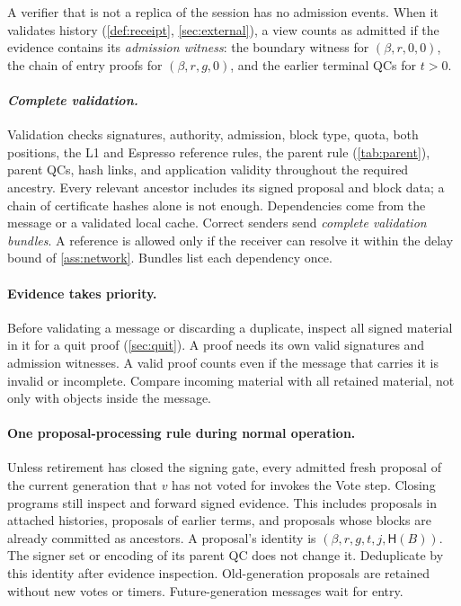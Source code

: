 \documentclass[11pt,a4paper]{article}
\newcommand{\Hash}{\mathsf H}
\newcommand{\defterm}[1]{\textcolor{rrBlue}{\textit{#1}}}
\begin{document}
A verifier that is not a replica of the session has no
admission events. When it validates history (\cref{def:receipt},
\cref{sec:external}), a view counts as admitted if the evidence contains
its \defterm{admission witness}: the boundary witness for $(\beta,r,0,0)$, the chain of
entry proofs for $(\beta,r,g,0)$, and the earlier terminal QCs for $t>0$.

\paragraph{\defterm{Complete validation.}}
Validation checks signatures, authority, admission, block type, quota,
both positions, the L1 and Espresso reference rules, the parent rule
(\cref{tab:parent}), parent QCs, hash links, and application validity
throughout the required ancestry. Every relevant ancestor includes its
signed proposal and block data; a chain of certificate hashes alone is
not enough. Dependencies come from the message or a validated local
cache. Correct senders send \defterm{complete validation bundles}. A reference is
allowed only if the receiver can resolve it within the delay bound of
\cref{ass:network}. Bundles list each dependency once.

\paragraph{Evidence takes priority.}
Before validating a message or discarding a duplicate, inspect all signed
material in it for a quit proof (\cref{sec:quit}). A proof needs its own
valid signatures and admission witnesses. A valid proof counts even if
the message that carries it is invalid or incomplete. Compare incoming
material with all retained material, not only with objects inside the
message.

\paragraph{One proposal-processing rule during normal operation.}
Unless retirement has closed the signing gate, every admitted fresh
proposal of the current generation that $v$ has not voted for invokes the
Vote step. Closing programs still inspect and forward signed evidence. This includes proposals in attached
histories, proposals of earlier terms, and proposals whose blocks are
already committed as ancestors. A proposal's identity is
$(\beta,r,g,t,j,\Hash(B))$. The signer set or encoding of its parent QC does
not change it. Deduplicate by this identity after evidence inspection.
Old-generation proposals are retained without new votes or timers.
Future-generation messages wait for entry.
\end{document}
